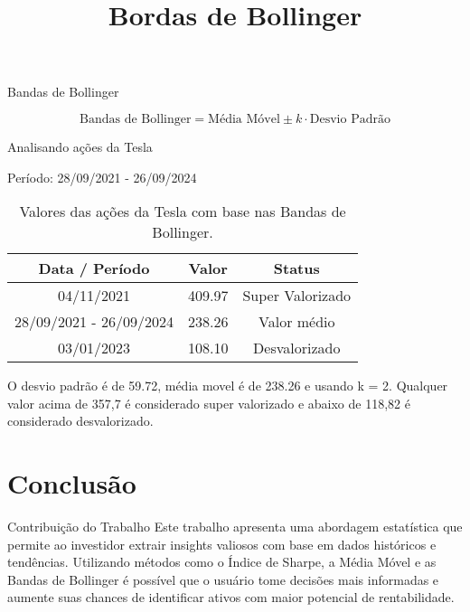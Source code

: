 \documentclass[aspectratio=169]{beamer}
\begin{document}
\begin{frame}{Bandas de Bollinger}

\[
\text{Bandas de Bollinger} = \text{Média Móvel} \pm k \cdot \text{Desvio Padrão}
\]

\begin{center}
    Analisando ações da Tesla  
\end{center}

\begin{center}
    Período: 28/09/2021 - 26/09/2024 \\
\end{center}
    
\begin{table}[h]
    \centering
    \large
    \begin{tabular}{|c|c|c|} %
        \hline %
        Data / Período  & Valor & Status \\ %
        \hline %
        04/11/2021  & 409.97 & Super Valorizado   \\ %
        \hline %
        28/09/2021 - 26/09/2024 & 238.26  & Valor médio  \\ %
        \hline %
        03/01/2023  & 108.10 & Desvalorizado   \\ %
        \hline %
    \end{tabular}
    \caption{Valores das ações da Tesla com base nas Bandas de Bollinger.}
    \title{Bordas de Bollinger}
    \label{tab:bollinger_table}
\end{table}

\begin{center}
    
 O desvio padrão é de 59.72, média movel é de 238.26 e usando k = 2. Qualquer valor acima de 357,7 é considerado super valorizado e abaixo de 118,82 é considerado desvalorizado.

\end{center}

\end{frame}
    
\section{Conclusão}
\begin{frame}{Contribuição do Trabalho}
  Este trabalho apresenta uma abordagem estatística que permite ao investidor extrair insights valiosos com base em dados históricos e tendências. Utilizando métodos como o Índice de Sharpe, a Média Móvel e as Bandas de Bollinger é possível que o usuário tome decisões mais informadas e aumente suas chances de identificar ativos com maior potencial de rentabilidade.
\end{frame}



\end{document}
